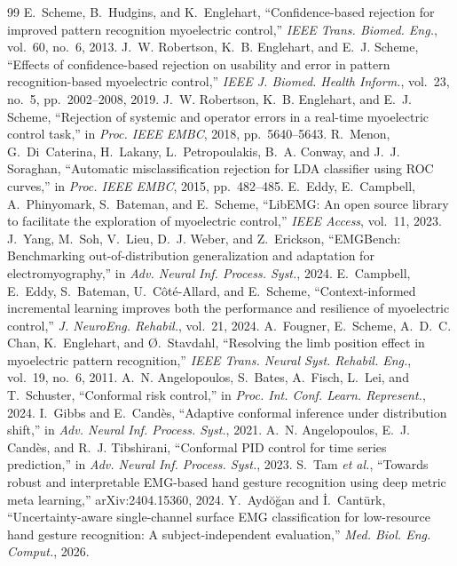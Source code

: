 \documentclass[conference]{IEEEtran}
\begin{document}
\begin{thebibliography}{99}
\footnotesize
{} E.~Scheme, B.~Hudgins, and K.~Englehart, ``Confidence-based rejection for improved pattern recognition myoelectric control,'' \emph{IEEE Trans. Biomed. Eng.}, vol.~60, no.~6, 2013.
 J.~W. Robertson, K.~B. Englehart, and E.~J. Scheme, ``Effects of confidence-based rejection on usability and error in pattern recognition-based myoelectric control,'' \emph{IEEE J. Biomed. Health Inform.}, vol.~23, no.~5, pp.~2002--2008, 2019.
 J.~W. Robertson, K.~B. Englehart, and E.~J. Scheme, ``Rejection of systemic and operator errors in a real-time myoelectric control task,'' in \emph{Proc. IEEE EMBC}, 2018, pp.~5640--5643.
 R.~Menon, G.~Di~Caterina, H.~Lakany, L.~Petropoulakis, B.~A. Conway, and J.~J. Soraghan, ``Automatic misclassification rejection for LDA classifier using ROC curves,'' in \emph{Proc. IEEE EMBC}, 2015, pp.~482--485.
 E.~Eddy, E.~Campbell, A.~Phinyomark, S.~Bateman, and E.~Scheme, ``LibEMG: An open source library to facilitate the exploration of myoelectric control,'' \emph{IEEE Access}, vol.~11, 2023.
 J.~Yang, M.~Soh, V.~Lieu, D.~J. Weber, and Z.~Erickson, ``EMGBench: Benchmarking out-of-distribution generalization and adaptation for electromyography,'' in \emph{Adv. Neural Inf. Process. Syst.}, 2024.
 E.~Campbell, E.~Eddy, S.~Bateman, U.~C\^ot\'e-Allard, and E.~Scheme, ``Context-informed incremental learning improves both the performance and resilience of myoelectric control,'' \emph{J. NeuroEng. Rehabil.}, vol.~21, 2024.
 A.~Fougner, E.~Scheme, A.~D.~C. Chan, K.~Englehart, and \O.~Stavdahl, ``Resolving the limb position effect in myoelectric pattern recognition,'' \emph{IEEE Trans. Neural Syst. Rehabil. Eng.}, vol.~19, no.~6, 2011.
 A.~N. Angelopoulos, S.~Bates, A.~Fisch, L.~Lei, and T.~Schuster, ``Conformal risk control,'' in \emph{Proc. Int. Conf. Learn. Represent.}, 2024.
 I.~Gibbs and E.~Cand\`es, ``Adaptive conformal inference under distribution shift,'' in \emph{Adv. Neural Inf. Process. Syst.}, 2021.
 A.~N. Angelopoulos, E.~J. Cand\`es, and R.~J. Tibshirani, ``Conformal PID control for time series prediction,'' in \emph{Adv. Neural Inf. Process. Syst.}, 2023.
 S.~Tam \emph{et al.}, ``Towards robust and interpretable EMG-based hand gesture recognition using deep metric meta learning,'' arXiv:2404.15360, 2024.
 Y.~Ayd\u{o}\u{g}an and \.{I}.~Cant\"urk, ``Uncertainty-aware single-channel surface EMG classification for low-resource hand gesture recognition: A subject-independent evaluation,'' \emph{Med. Biol. Eng. Comput.}, 2026.

\end{thebibliography}
\end{document}
